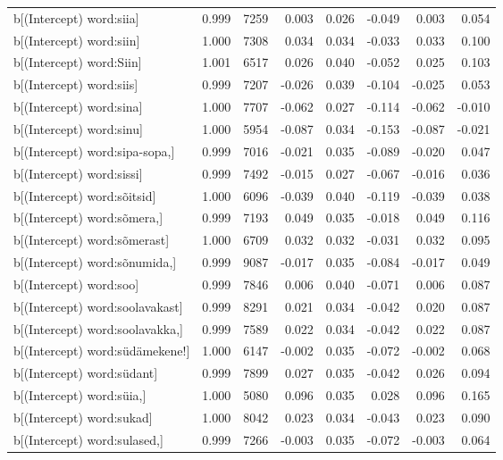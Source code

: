 \begin{longtable}{lrrrrrrr}
  b[(Intercept) word:siia] & 0.999 & 7259 & 0.003 & 0.026 & -0.049 & 0.003 & 0.054 \\ 
  b[(Intercept) word:siin] & 1.000 & 7308 & 0.034 & 0.034 & -0.033 & 0.033 & 0.100 \\ 
  b[(Intercept) word:Siin] & 1.001 & 6517 & 0.026 & 0.040 & -0.052 & 0.025 & 0.103 \\ 
  b[(Intercept) word:siis] & 0.999 & 7207 & -0.026 & 0.039 & -0.104 & -0.025 & 0.053 \\ 
  b[(Intercept) word:sina] & 1.000 & 7707 & -0.062 & 0.027 & -0.114 & -0.062 & -0.010 \\ 
  b[(Intercept) word:sinu] & 1.000 & 5954 & -0.087 & 0.034 & -0.153 & -0.087 & -0.021 \\ 
  b[(Intercept) word:sipa-sopa,] & 0.999 & 7016 & -0.021 & 0.035 & -0.089 & -0.020 & 0.047 \\ 
  b[(Intercept) word:sissi] & 0.999 & 7492 & -0.015 & 0.027 & -0.067 & -0.016 & 0.036 \\ 
  b[(Intercept) word:sõitsid] & 1.000 & 6096 & -0.039 & 0.040 & -0.119 & -0.039 & 0.038 \\ 
  b[(Intercept) word:sõmera,] & 0.999 & 7193 & 0.049 & 0.035 & -0.018 & 0.049 & 0.116 \\ 
  b[(Intercept) word:sõmerast] & 1.000 & 6709 & 0.032 & 0.032 & -0.031 & 0.032 & 0.095 \\ 
  b[(Intercept) word:sõnumida,] & 0.999 & 9087 & -0.017 & 0.035 & -0.084 & -0.017 & 0.049 \\ 
  b[(Intercept) word:soo] & 0.999 & 7846 & 0.006 & 0.040 & -0.071 & 0.006 & 0.087 \\ 
  b[(Intercept) word:soolavakast] & 0.999 & 8291 & 0.021 & 0.034 & -0.042 & 0.020 & 0.087 \\ 
  b[(Intercept) word:soolavakka,] & 0.999 & 7589 & 0.022 & 0.034 & -0.042 & 0.022 & 0.087 \\ 
  b[(Intercept) word:südämekene!] & 1.000 & 6147 & -0.002 & 0.035 & -0.072 & -0.002 & 0.068 \\ 
  b[(Intercept) word:südant] & 0.999 & 7899 & 0.027 & 0.035 & -0.042 & 0.026 & 0.094 \\ 
  b[(Intercept) word:süia,] & 1.000 & 5080 & 0.096 & 0.035 & 0.028 & 0.096 & 0.165 \\ 
  b[(Intercept) word:sukad] & 1.000 & 8042 & 0.023 & 0.034 & -0.043 & 0.023 & 0.090 \\ 
  b[(Intercept) word:sulased,] & 0.999 & 7266 & -0.003 & 0.035 & -0.072 & -0.003 & 0.064 \\ 

\end{longtable}
